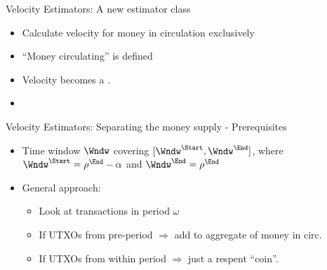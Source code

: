 \documentclass[]{beamer}
\begin{document}


\begin{frame}{Velocity Estimators: A new estimator class}
  \vfill
  \begin{itemize}
  \item Calculate velocity for money in circulation exclusively
  \item ``Money circulating'' is defined 
  \end{itemize}
  \vfill
  \centering{\mbox{\Large $\Downarrow$}}
  \vfill
  \begin{itemize}
  \item Velocity becomes a .
  \item {}
  \end{itemize}
  \vfill
\end{frame}


\begin{frame}{Velocity Estimators: Separating the money supply - Prerequisites}
  \begin{itemize}
  \item  Time window \(\Wndw\) covering \([\Wndw^\Start , \Wndw^\End]\), where \(\Wndw^\Start = \rho^{\End} - \alpha\) and \(\Wndw^\End = \rho^\End\) %
  \item General approach:
    \begin{itemize}
    \item Look at transactions in period \(\omega\)
    \item If UTXOs from pre-period \(\Rightarrow\) add to aggregate of money in circ.
    \item If UTXOs from within period \(\Rightarrow\) just a respent ``coin''.  
    \end{itemize}
  \end{itemize}
\end{frame}


\end{document}
